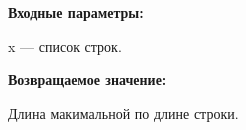 \textbf{Входные параметры:}
 
x --- список строк.

\textbf{Возвращаемое значение:}

Длина макимальной по длине строки.